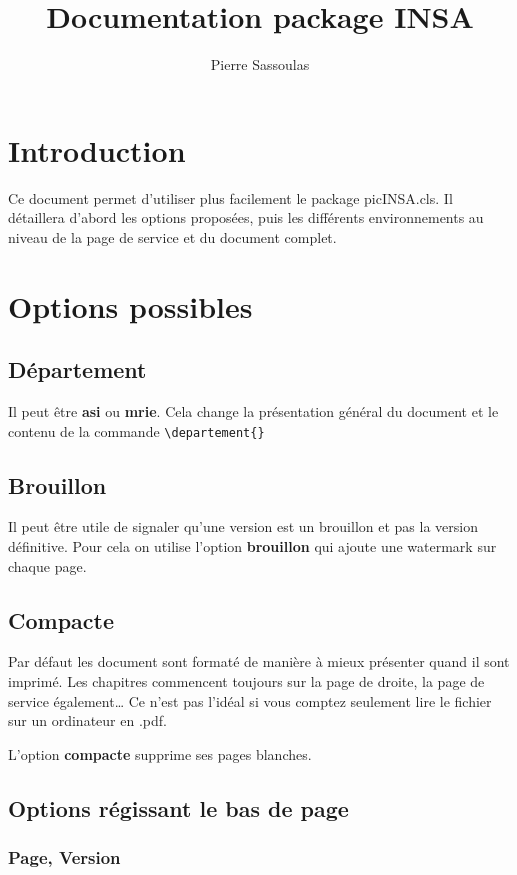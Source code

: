 \documentclass[asi,compacte,brouillon]{picINSA}
\title{Documentation package INSA}
\author{Pierre Sassoulas}
\begin{document}
\maketitle{}
\tableofcontents{}
\chapter*{Introduction}

Ce document permet d'utiliser plus facilement le package picINSA.cls. Il détaillera d'abord les options proposées, puis les différents environnements au niveau de la page de service et du document complet.

\chapter{Options possibles}

\section{Département}

Il peut être \textbf{asi} ou \textbf{mrie}. Cela change la présentation général du document et le contenu de la commande \verb+\departement{}+

\section{Brouillon}

Il peut être utile de signaler qu'une version est un brouillon et pas la version définitive. Pour cela on utilise l'option \textbf{brouillon} qui ajoute une watermark sur chaque page.

\section{Compacte}

Par défaut les document sont formaté de manière à mieux présenter quand il sont imprimé. Les chapitres commencent toujours sur la page de droite, la page de service également\dots{}
Ce n'est pas l'idéal si vous comptez seulement lire le fichier sur un ordinateur en .pdf.

L'option \textbf{compacte} supprime ses pages blanches.

 \section{Options régissant le bas de page}
\subsection{Page, Version}
\end{document}
